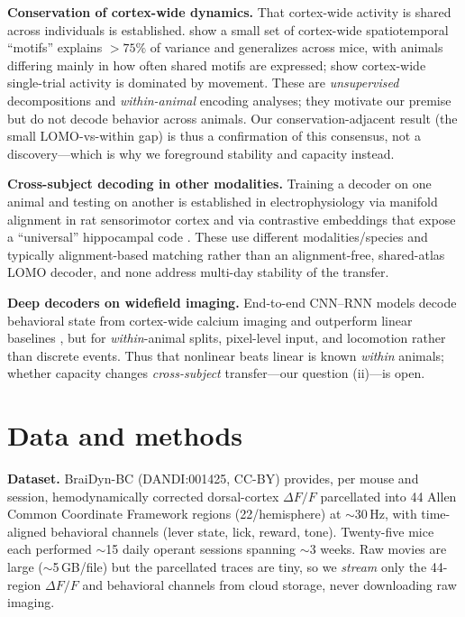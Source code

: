 \documentclass{article}
\begin{document}
\textbf{Conservation of cortex-wide dynamics.} That cortex-wide activity is shared across
individuals is established. \citet{macdowell2020,macdowell2024} show a small set of cortex-wide
spatiotemporal ``motifs'' explains $>75\%$ of variance and generalizes across mice, with animals
differing mainly in how often shared motifs are expressed; \citet{musall2019} show cortex-wide
single-trial activity is dominated by movement. These are \emph{unsupervised} decompositions and
\emph{within-animal} encoding analyses; they motivate our premise but do not decode behavior
across animals. Our conservation-adjacent result (the small LOMO-vs-within gap) is thus a
confirmation of this consensus, not a discovery---which is why we foreground stability and
capacity instead.

\textbf{Cross-subject decoding in other modalities.} Training a decoder on one animal and testing
on another is established in electrophysiology via manifold alignment in rat sensorimotor cortex
\citep{melbaum2022} and via contrastive embeddings that expose a ``universal'' hippocampal code
\citep{schneider2023}. These use different modalities/species and typically alignment-based
matching rather than an alignment-free, shared-atlas LOMO decoder, and none address multi-day
stability of the transfer.

\textbf{Deep decoders on widefield imaging.} End-to-end CNN--RNN models decode behavioral state
from cortex-wide calcium imaging and outperform linear baselines \citep{ajioka2024}, but for
\emph{within}-animal splits, pixel-level input, and locomotion rather than discrete events. Thus
that nonlinear beats linear is known \emph{within} animals; whether capacity changes
\emph{cross-subject} transfer---our question (ii)---is open.

\section{Data and methods}
\textbf{Dataset.} BraiDyn-BC \citep{kondo2025} (DANDI:001425, CC-BY) provides, per mouse and
session, hemodynamically corrected dorsal-cortex $\Delta F/F$ parcellated into 44 Allen Common
Coordinate Framework regions (22/hemisphere) at $\sim$30\,Hz, with time-aligned behavioral
channels (lever state, lick, reward, tone). Twenty-five mice each performed $\sim$15 daily
operant sessions spanning $\sim$3 weeks. Raw movies are large ($\sim$5\,GB/file) but the
parcellated traces are tiny, so we \emph{stream} only the 44-region $\Delta F/F$ and behavioral
channels from cloud storage, never downloading raw imaging.
\end{document}
